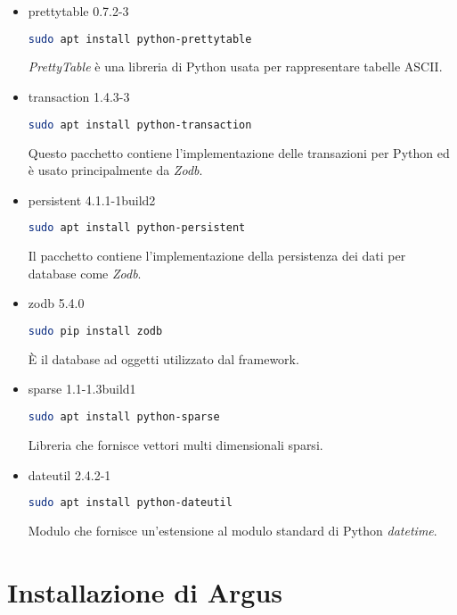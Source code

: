 \documentclass[../main.tex]{subfiles}
\begin{document}
\begin{itemize}
				\item prettytable 0.7.2-3 \cite{prettytabledef}
\begin{lstlisting}[language=bash]
 sudo apt install python-prettytable
\end{lstlisting}
\textit{PrettyTable} è una libreria di Python usata per rappresentare tabelle ASCII.
				\item transaction 1.4.3-3 \cite{transactiondef}
\begin{lstlisting}[language=bash]
 sudo apt install python-transaction
\end{lstlisting}
								Questo pacchetto contiene l'implementazione delle transazioni per Python ed è usato principalmente da \textit{Zodb}.
				\item persistent 4.1.1-1build2 \cite{persistentdef}
\begin{lstlisting}[language=bash]
 sudo apt install python-persistent
\end{lstlisting}
								Il pacchetto contiene l'implementazione della persistenza dei dati per database come \textit{Zodb}.
				\item zodb 5.4.0 \cite{zodbdef}
\begin{lstlisting}[language=bash]
 sudo pip install zodb
\end{lstlisting}
È il database ad oggetti utilizzato dal framework.
				\item sparse 1.1-1.3build1 \cite{sparsedef}
\begin{lstlisting}[language=bash]
 sudo apt install python-sparse
\end{lstlisting}
Libreria che fornisce vettori multi dimensionali sparsi.
				\item dateutil 2.4.2-1 \cite{dateutildef}
\begin{lstlisting}[language=bash]
 sudo apt install python-dateutil
\end{lstlisting}
								Modulo che fornisce un'estensione al modulo standard di Python \textit{datetime}.

\end{itemize}

\section{Installazione di Argus}
\end{document}
